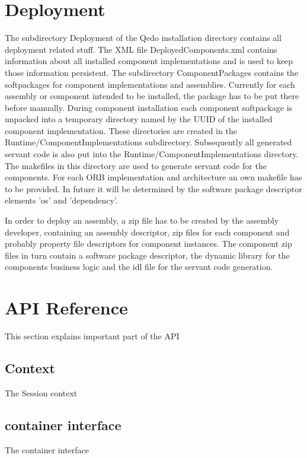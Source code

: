 \documentclass[12pt,a4paper]{report}
\begin{document}
\chapter{Deployment}
\label{sec:Deployment}
The subdirectory Deployment of the Qedo installation directory contains all deployment related stuff. The XML file DeployedComponents.xml contains information about all installed component implementations and is used to keep those information persistent. The subdirectory ComponentPackages contains the softpackages for component implementations and assemblies. Currently for each assembly or component intended to be installed, the package has to be put there before manually. During component installation each component softpackage is unpacked into a temporary directory named by the UUID of the installed component implementation. These directories are created in the Runtime/ComponentImplementations subdirectory. Subsequently all generated servant code is also put into the Runtime/ComponentImplementations directory. The makefiles in this directory are used to generate servant code for the components. For each ORB implementation and architecture an own makefile
has to be provided. In future it will be determined by the software package descriptor elements 'os' and 'dependency'.

In order to deploy an assembly, a zip file has to be created by the assembly developer, containing an assembly descriptor, zip files for each component  and probably property file descriptors for component instances. The component zip files in turn contain a software package descriptor, the dynamic library for the components business logic and the idl file for the servant code generation.

\chapter{API Reference}
\label{sec:APIReference}

This section explains important part of the API

\section{Context}
\label{sec:Context}

The Session context


\section{container interface}
\label{sec:containerInterface}
The container interface
\end{document}
